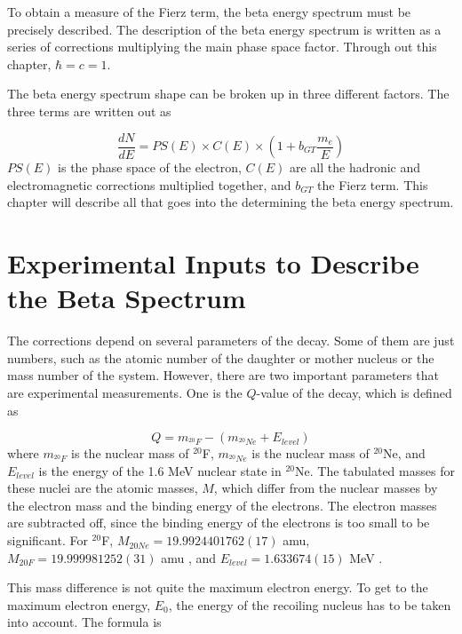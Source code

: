 \documentclass[../MaxHughesThesis.tex]{subfiles}
\begin{document}
To obtain a measure of the Fierz term, the beta energy spectrum must be precisely described.
The description of the beta energy spectrum is written as a series of corrections multiplying the main phase space factor.  
Through out this chapter, $\hbar = c = 1$.

The beta energy spectrum shape can be broken up in three different factors. 
The three terms are written out as  %

\begin{equation}
	\frac{dN}{dE} = PS(E) \times C(E) \times (1 + b_{GT}\frac{m_{e}}{E})
	\label{eq:betaspectrum}
\end{equation}
$PS(E)$ is the phase space of the electron, $C(E)$ are all the hadronic and electromagnetic corrections multiplied together, and $b_{GT}$ the Fierz term.
This chapter will describe all that goes into the determining the beta energy spectrum.

\section{Experimental Inputs to Describe the Beta Spectrum}
The corrections depend on several parameters of the decay. 
Some of them are just numbers, such as the atomic number of the daughter or mother nucleus or the mass number of the system.
However, there are two important parameters that are experimental measurements.
One is the $Q$-value of the decay, which is defined as %

\begin{equation}
	Q = m_{^{20}F} - (m_{^{20}Ne} + E_{level})
	\label{eq:qval}
\end{equation} 
where $m_{^{20}F}$ is the nuclear mass of $^{20}$F, $m_{^{20}Ne}$ is the nuclear mass of $^{20}$Ne, and $E_{level}$ is the energy of the 1.6 MeV nuclear state in $^{20}$Ne. 
The tabulated masses for these nuclei are the atomic masses, $M$, which differ from the nuclear masses by the electron mass and the binding energy of the electrons.
The electron masses are subtracted off, since the binding energy of the electrons is too small to be significant.
For $^{20}$F, $M_{20Ne} = 19.9924401762 (17)$ amu, $M_{20F} = 19.999981252 (31) $ amu \cite{Wan17} , and $E_{level} = 1.633674 (15)$ MeV  \cite{Til98} .

This mass difference is not quite the maximum electron energy. 
To get to the maximum electron energy, $E_{0}$, the energy of the recoiling nucleus has to be taken into account.
The formula is \cite{Hol74}%
\end{document}
